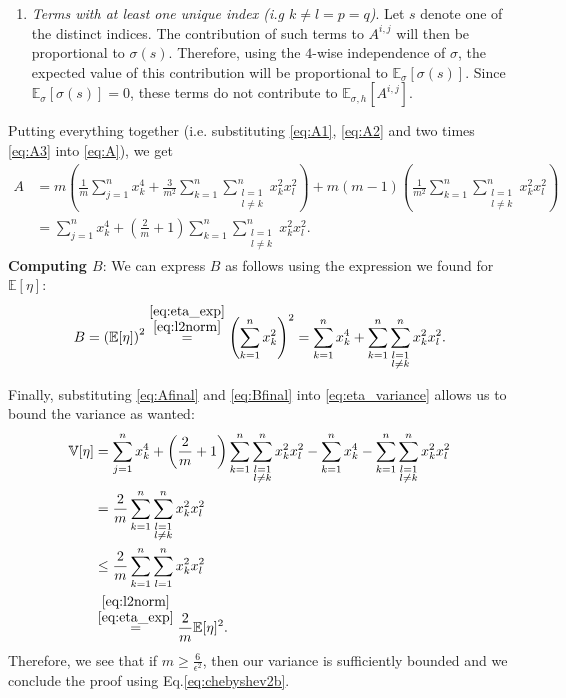 \documentclass[10pt,usenames,dvipsnames]{article}
\newcommand{\Ebb}{\mathbb{E}}
\newcommand{\Vbb}{\mathbb{V}}
\newenvironment{exercise}[2][Exercise]{\begin{trivlist}
  \item[\hskip \labelsep {\bfseries #1}\hskip \labelsep {\bfseries #2.}]}{\end{trivlist}}
\begin{document}
\begin{exercise}{2b}
\begin{enumerate}
			\item \textit{Terms with at least one unique index (i.g $k\neq l=p=q$)}. Let $s$ denote one of the distinct indices. The contribution of such terms to $A^{i,j}$ will then be proportional to $\sigma(s)$. Therefore, using the $4$-wise independence of $\sigma$, the expected value of this contribution will be proportional to $\Ebb_\sigma[\sigma(s)]$. Since $\Ebb_\sigma[\sigma(s)]=0$, these terms do not contribute to $\Ebb_{\sigma,h}[A^{i,j}]$.
		\end{enumerate}
		Putting everything together (i.e. substituting \eqref{eq:A1}, \eqref{eq:A2} and two times \eqref{eq:A3} into \eqref{eq:A}), we get
		\begin{align}
		A & = m \left( \frac{1}{m} \sum_{j=1}^n x_k^4 + \frac{3}{m^2} \sum_{k=1}^n \sum_{\substack{l=1 \\ l \neq k}}^n x_k^2 x_l^2 \right)  + m(m-1) \left( \frac{1}{m^2} \sum_{k=1}^n \sum_{\substack{l=1 \\ l \neq k}}^n x_k^2 x_l^2 \right) \nonumber \\
		 & = \sum_{j=1}^n x_k^4 + \left(\frac{2}{m}+1\right)\sum_{k=1}^n \sum_{\substack{l=1 \\ l \neq k}}^n x_k^2 x_l^2. \label{eq:Afinal}
		\end{align}
		\textbf{Computing $B$}: We can express $B$ as follows using the expression we found for $\Ebb[\eta]$:
		\begin{equation}
		B  	= \left(\Ebb[\eta]\right)^2  
			\overset{\substack{\eqref{eq:eta_exp} \\ \eqref{eq:l2norm}}}{=} \left(\sum_{k=1}^n x_k^2 \right)^2 
			= \sum_{k=1}^n x_k^4 + \sum_{k=1}^n \sum_{\substack{l=1 \\ l \neq k}}^n x_k^2x_l^2 . \label{eq:Bfinal}
		\end{equation}
		
		Finally, substituting \eqref{eq:Afinal} and \eqref{eq:Bfinal}  into \eqref{eq:eta_variance} allows us to bound the variance as wanted:
		\begin{align*}
		\Vbb[\eta] & = \sum_{j=1}^n x_k^4 +  \left(\frac{2}{m}+1\right)\sum_{k=1}^n \sum_{\substack{l=1 \\ l \neq k}}^n x_k^2 x_l^2 - \sum_{k=1}^n x_k^4 - \sum_{k=1}^n \sum_{\substack{l=1 \\ l \neq k}}^n x_k^2x_l^2 \\
				& = \frac{2}{m} \sum_{k=1}^n \sum_{\substack{l=1 \\ l \neq k}}^n x_k^2 x_l^2 \\
				& \leq \frac{2}{m}  \sum_{k=1}^n \sum_{l=1}^n x_k^2 x_l^2 \\
				& \overset{\substack{\eqref{eq:l2norm} \\ \eqref{eq:eta_exp}}}{=} \frac{2}{m}\Ebb[\eta]^2.
		\end{align*}
		Therefore, we see that if $m \geq \frac{6}{\epsilon^2}$, then our variance is sufficiently bounded and we conclude the proof using Eq.\eqref{eq:chebyshev2b}.
  \end{exercise}
  
\end{document}
